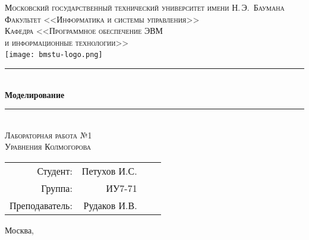\newcommand{\HRule}{\rule{\linewidth}{0.5mm}}

\begin{center}

\textsc{\large Московский государственный технический университет имени Н.\,Э.~Баумана}\\[0.5cm]
\textsc{Факультет <<Информатика и системы управления>>}\\
\textsc{Кафедра <<Программное обеспечение ЭВМ\\и информационные технологии>>}\\[0.25cm]

\texttt{[image: bmstu-logo.png]}~\\[2.25cm]



\HRule \\[0.5cm]
{\huge \bfseries Моделирование}
\HRule \\[0.5cm]

\textsc{\large Лабораторная работа №1}\\
\textsc{Уравнения Колмогорова}

\vfill

\begin{flushright}
  \begin{tabular}{rrlc}
    Студент: & Петухов И.С.\\
    Группа: & ИУ7-71\\
    Преподаватель: & Рудаков И.В.\\
  \end{tabular}
\end{flushright}

{\large Москва, \the\year}

\end{center}

\newpage
{}